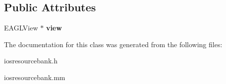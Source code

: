 \subsection*{Public Attributes}
\begin{DoxyCompactItemize}
\item 
\hypertarget{classg2c_1_1_i_o_s_resource_bank_ae72f57b548bb4588241ddc9952693fa1}{
EAGLView $\ast$ {\bfseries view}}
\label{classg2c_1_1_i_o_s_resource_bank_ae72f57b548bb4588241ddc9952693fa1}

\end{DoxyCompactItemize}


The documentation for this class was generated from the following files:\begin{DoxyCompactItemize}
\item 
iosresourcebank.h\item 
iosresourcebank.mm\end{DoxyCompactItemize}
